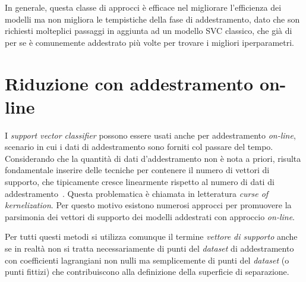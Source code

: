 In generale, questa classe di approcci è efficace nel migliorare l'efficienza dei modelli ma non migliora le tempistiche della fase di addestramento, dato che son richiesti molteplici passaggi in aggiunta ad un modello SVC classico, che già di per se è comunemente addestrato più volte per trovare i migliori iperparametri.

\section{Riduzione con addestramento on-line}\label{sec:sparsesvm:on-line}
I \emph{support vector classifier} possono essere usati anche per addestramento \emph{on-line}, scenario in cui i dati di addestramento sono forniti col passare del tempo. 
Considerando che la quantità di dati d'addestramento non è nota a priori, risulta fondamentale inserire delle tecniche per contenere il numero di vettori di supporto, che tipicamente cresce linearmente rispetto al numero di dati di addestramento~\cite{2003_online_classification_on_a_budget}. 
Questa problematica è chiamata in letteratura \emph{curse of kernelization}\cite{2012_bsgd}. 
Per questo motivo esistono numerosi approcci per promuovere la parsimonia dei vettori di supporto dei modelli addestrati con approccio \emph{on-line}.

Per tutti questi metodi si utilizza comunque il termine \emph{vettore di supporto} anche se in realtà non si tratta necessariamente di punti del \emph{dataset} di addestramento con coefficienti lagrangiani non nulli ma semplicemente di punti del \emph{dataset} (o punti fittizi) che contribuiscono alla definizione della superficie di separazione.

